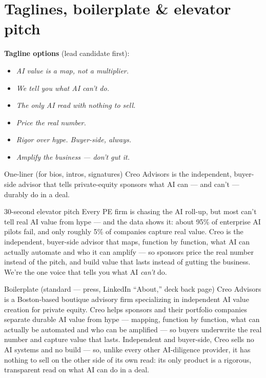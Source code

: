 \documentclass[11pt]{article}
\begin{document}
\section{Taglines, boilerplate \& elevator pitch}
\textbf{Tagline options} (lead candidate first):
\begin{itemize}
  \item \emph{AI value is a map, not a multiplier.}
  \item \emph{We tell you what AI can't do.}
  \item \emph{The only AI read with nothing to sell.}
  \item \emph{Price the real number.}
  \item \emph{Rigor over hype. Buyer-side, always.}
  \item \emph{Amplify the business --- don't gut it.}
\end{itemize}

\begin{copybox}{One-liner (for bios, intros, signatures)}
Creo Advisors is the independent, buyer-side advisor that tells private-equity sponsors what AI
can --- and can't --- durably do in a deal.
\end{copybox}

\begin{copybox}{30-second elevator pitch}
Every PE firm is chasing the AI roll-up, but most can't tell real AI value from hype --- and the
data shows it: about 95\% of enterprise AI pilots fail, and only roughly 5\% of companies capture
real value. Creo is the independent, buyer-side advisor that maps, function by function, what AI
can actually automate and who it can amplify --- so sponsors price the real number instead of the
pitch, and build value that lasts instead of gutting the business. We're the one voice that tells
you what AI \emph{can't} do.
\end{copybox}

\begin{copybox}{Boilerplate (standard --- press, LinkedIn ``About,'' deck back page)}
Creo Advisors is a Boston-based boutique advisory firm specializing in independent AI value
creation for private equity. Creo helps sponsors and their portfolio companies separate durable
AI value from hype --- mapping, function by function, what can actually be automated and who can
be amplified --- so buyers underwrite the real number and capture value that lasts. Independent
and buyer-side, Creo sells no AI systems and no build --- so, unlike every other AI-diligence
provider, it has nothing to sell on the other side of its own read: its only product is a rigorous,
transparent read on what AI can do in a deal.
\end{copybox}
\end{document}
